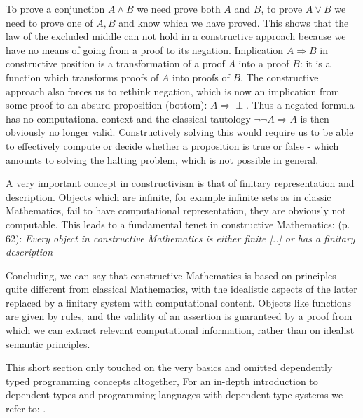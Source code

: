 To prove a conjunction $A \land B$ we need prove both $A$ and $B$, to prove $A \lor B$ we need to prove one of $A, B$ and know which we have proved. This shows that the law of the excluded middle can not hold in a constructive approach because we have no means of going from a proof to its negation. Implication $A \Rightarrow B$ in constructive position is a transformation of a proof $A$ into a proof $B$: it is a function which transforms proofs of $A$ into proofs of $B$. The constructive approach also forces us to rethink negation, which is now an implication from some proof to an absurd proposition (bottom): $A \Rightarrow \perp$. Thus a negated formula has no computational context and the classical tautology $\neg \neg A \Rightarrow A$ is then obviously no longer valid.  Constructively solving this would require us to be able to effectively compute or decide whether a proposition is true or false - which amounts to solving the halting problem, which is not possible in general.

A very important concept in constructivism is that of finitary representation and description. Objects which are infinite, for example infinite sets as in classic Mathematics, fail to have computational representation, they are obviously not computable. This leads to a fundamental tenet in constructive Mathematics: \cite{thompson_type_1991} (p. 62): \textit{Every object in constructive Mathematics is either finite [..] or has a finitary description}

Concluding, we can say that constructive Mathematics is based on principles quite different from classical Mathematics, with the idealistic aspects of the latter replaced by a finitary system with computational content. Objects like functions are given by rules, and the validity of an assertion is guaranteed by a proof from which we can extract relevant computational information, rather than on idealist semantic principles. 

This short section only touched on the very basics and omitted dependently typed programming concepts altogether, For an in-depth introduction to dependent types and programming languages with dependent type systems we refer to: \cite{brady_type-driven_2017, pierce_programming_2018, program_homotopy_2013, stump_verified_2016, thompson_type_1991}.


